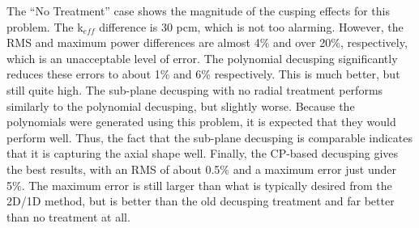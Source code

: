 \begin{table}[h]
\centering
\caption{VERA Problem 4 Decusping Results}\label{t:p4decusp}
\end{table}

The ``No Treatment'' case shows the magnitude of the cusping effects for this problem.  The k$_{eff}$ difference is 30 pcm, which is not too alarming.  However, the RMS and maximum power differences are almost 4\% and over 20\%, respectively, which is an unacceptable level of error.  The polynomial decusping significantly reduces these errors to about 1\% and 6\% respectively.  This is much better, but still quite high.  The sub-plane decusping with no radial treatment performs similarly to the polynomial decusping, but slightly worse.  Because the polynomials were generated using this problem, it is expected that they would perform well.  Thus, the fact that the sub-plane decusping is comparable indicates that it is capturing the axial shape well.  Finally, the CP-based decusping gives the best results, with an RMS of about 0.5\% and a maximum error just under 5\%.  The maximum error is still larger than what is typically desired from the 2D/1D method, but is better than the old decusping treatment and far better than no treatment at all.

